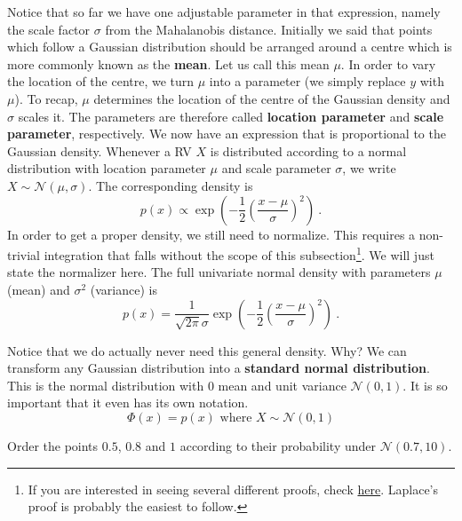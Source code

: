 \documentclass[a4paper,11pt,leqno]{report}\usepackage[]{graphicx}\usepackage[]{color}
\newcommand{\N}[2]{\mathcal{N}\left( #1, #2 \right)}
\begin{document}
Notice that so far we have one adjustable parameter in that expression, namely the scale factor $ \sigma $ from the Mahalanobis distance. Initially we said
that points which follow a Gaussian distribution should be arranged around a centre which is more commonly known as the \textbf{mean}. 
Let us call this mean $ \mu $. In order to vary the location of the centre,
we turn $ \mu $ into a parameter (we simply replace $ y $ with $ \mu $). To recap, $ \mu $ determines the location
of the centre of the Gaussian density and $ \sigma $ scales it. The parameters are therefore called \textbf{location parameter} and \textbf{scale parameter}, respectively.
We now have an expression that is proportional to the Gaussian density. Whenever a RV $ X $ is distributed according to a normal distribution with location parameter
$ \mu $ and scale parameter $ \sigma $, we write $ X \sim \N{\mu}{\sigma} $. The corresponding density is
\begin{equation}
p(x) \propto \exp\left(-\frac{1}{2} \left(\frac{x - \mu}{\sigma}\right)^{2} \right) \ .
\end{equation}
In order to get a proper density, we still need to normalize. This requires a non-trivial integration that falls without the scope of this subsection\footnote{If
you are interested in seeing several different proofs, check \href{https://en.wikipedia.org/wiki/Gaussian_integral}{here}. Laplace's proof is probably the easiest to follow.}. We
will just state the normalizer here. The full univariate normal density with parameters $ \mu $ (mean) and $ \sigma^{2} $ (variance) is
\begin{equation}
p(x) = \frac{1}{\sqrt{2\pi}\sigma} \exp\left(-\frac{1}{2} \left(\frac{x - \mu}{\sigma}\right)^{2} \right) \ .
\end{equation}

Notice that we do actually never need this general density. Why? We can transform any Gaussian distribution into a \textbf{standard normal distribution}. This is 
the normal distribution with 0 mean and unit variance $ \N{0}{1} $. It is so important that it even has its own notation. 
\begin{equation}
\Phi(x) = p(x) \mbox{ where } X \sim \N{0}{1}
\end{equation}

\begin{Exercise}
Order the points $ 0.5 $, $ 0.8 $ and $ 1 $ according to their probability under $ \N{0.7}{10} $.
\end{Exercise}
\end{document}
